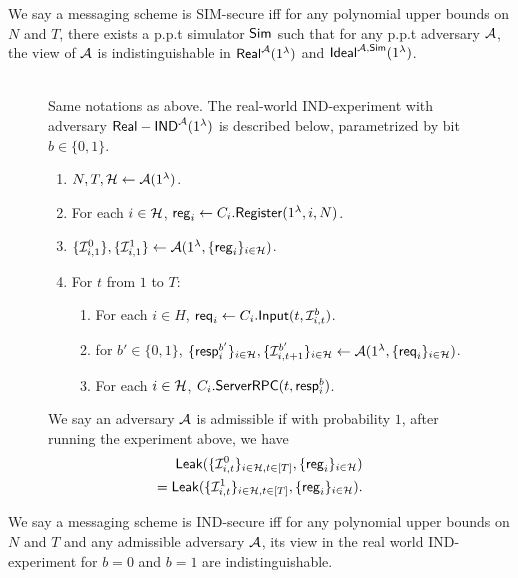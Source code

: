 \begin{definition}
\label{defn:SIM-secure}
We say a messaging scheme is SIM-secure iff for  any polynomial upper bounds on $N$ and $T$, there exists a p.p.t simulator $\mathsf{Sim}$ such that for any p.p.t adversary $\mathcal{A}$, the view of $\mathcal{A}$ is indistinguishable in $\mathsf{Real}^{\mathcal{A}}(1^{\lambda})$ and $\mathsf{Ideal}^{\mathcal{A}, \mathsf{\mathsf{Sim}}}(1^{\lambda})$.
\end{definition}


\begin{figure}
\begin{framed}
\begin{definition} \hfill\\
\label{defn:ind-real-world}
Same notations as above. The real-world IND-experiment with adversary $\mathsf{Real-IND}^{\mathcal{A}}(1^{\lambda})$ is described below, parametrized by bit $b \in \{0, 1\}$.
\begin{enumerate}
\item $N, T, \mathcal{H} \leftarrow \mathcal{A}(1^{\lambda})$.
\item For each $i \in \mathcal{H}$, $\mathsf{reg}_i \leftarrow C_i.\mathsf{Register}(1^{\lambda}, i, N)$. 
\item $\{\mathcal{I}^{0}_{i, 1}\}, \{\mathcal{I}^{1}_{i, 1}\} \leftarrow \mathcal{A}(1^{\lambda}, \{\mathsf{reg}_i\}_{i \in \mathcal{H}})$.
\item For $t$ from $1$ to $T$:
    \begin{enumerate}
    \item For each $i \in H$, $\mathsf{req}_i \leftarrow C_i.\mathsf{Input}(t, \mathcal{I}^{b}_{i, t})$.
    
    \item for $b'\in \{0, 1\}$, $\{\mathsf{resp}^{b'}_i\}_{i \in \mathcal{H}},\{\mathcal{I}^{b'}_{i, t + 1}\}_{i \in \mathcal{H}} \leftarrow \mathcal{A}(1^{\lambda}, \{\mathsf{req}_i\}_{i \in \mathcal{H}})$.
    
    \item For each $i \in \mathcal{H}$, $C_i.\mathsf{ServerRPC}(t, \mathsf{resp}^{b}_i)$.
    \end{enumerate}
\end{enumerate}
We say an adversary $\mathcal{A}$ is admissible if with probability $1$, after running the experiment above, we have
\begin{align*}
\mathsf{Leak}(\{\mathcal{I}^{0}_{i, t}\}_{i \in \mathcal{H}, t \in [T]}, \{\mathsf{reg}_i\}_{i \in \mathcal{H}}) \\
= \mathsf{Leak}(\{\mathcal{I}^{1}_{i, t}\}_{i \in \mathcal{H}, t \in [T]}, \{\mathsf{reg}_i\}_{i \in \mathcal{H}}).    
\end{align*}
\end{definition}
\end{framed}
\end{figure}
\begin{definition}
We say a messaging scheme is IND-secure iff for any polynomial upper bounds on $N$ and $T$ and any admissible adversary $\mathcal{A}$, its view in the real world IND-experiment for $b = 0$ and $b = 1$ are indistinguishable.
\end{definition}

